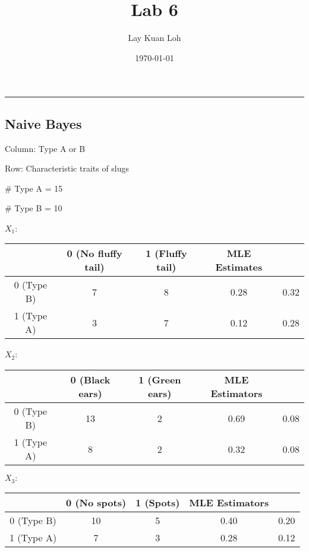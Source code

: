 \documentclass[12pt]{article}
\title{Lab 6}
\author{Lay Kuan Loh}
\date{\today}
\begin{document}
  \maketitle

  \vspace{-0.3in}
  \rule{\linewidth}{0.4pt}




\subsection{Naive Bayes}

Column: Type A or B

Row: Characteristic traits of slugs

\# Type A = 15

\# Type B = 10

$X_1$:

\begin{tabular}{c || c |c || c c}
               & 0 (No fluffy tail) & 1 (Fluffy tail) & MLE Estimates & \\
  \hline
  \hline
  0 (Type B)   & 7 & 8 & 0.28 & 0.32 \\
  \hline
  1 (Type A)   & 3 & 7 & 0.12 & 0.28 \\
\end{tabular}

$X_2$:

\begin{tabular}{c || c |c || c c}
               & 0 (Black ears) & 1 (Green ears) & MLE Estimators & \\
  \hline
  \hline
  0 (Type B)   & 13 & 2 & 0.69 & 0.08 \\
  \hline
  1 (Type A)   & 8  & 2 & 0.32 & 0.08\\
\end{tabular}

$X_3:$

\begin{tabular}{c || c |c || c c}
               & 0 (No spots) & 1 (Spots) & MLE Estimators & \\
  \hline
  \hline
  0 (Type B)   & 10 & 5 & 0.40 & 0.20\\
  \hline
  1 (Type A)   & 7 & 3  & 0.28 & 0.12\\
\end{tabular}
\end{document}

